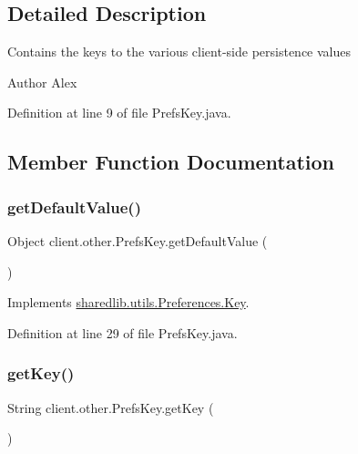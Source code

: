 \subsection{Detailed Description}
Contains the keys to the various client-\/side persistence values \begin{DoxyAuthor}{Author}
Alex 
\end{DoxyAuthor}


Definition at line 9 of file Prefs\+Key.\+java.



\subsection{Member Function Documentation}
\hypertarget{enumclient_1_1other_1_1_prefs_key_a7d50bec7ffef68ca2b9657cc4a8b271f}{}\label{enumclient_1_1other_1_1_prefs_key_a7d50bec7ffef68ca2b9657cc4a8b271f} 
\subsubsection{\texorpdfstring{get\+Default\+Value()}{getDefaultValue()}}
{\footnotesize\ttfamily Object client.\+other.\+Prefs\+Key.\+get\+Default\+Value (\begin{DoxyParamCaption}{ }\end{DoxyParamCaption})}



Implements \hyperlink{interfacesharedlib_1_1utils_1_1_preferences_1_1_key_ab68710164c21a369f40429b1d41eb59e}{sharedlib.\+utils.\+Preferences.\+Key}.



Definition at line 29 of file Prefs\+Key.\+java.

\hypertarget{enumclient_1_1other_1_1_prefs_key_a204beaf7ef2607c5ee052bf712d5fc66}{}\label{enumclient_1_1other_1_1_prefs_key_a204beaf7ef2607c5ee052bf712d5fc66} 
\subsubsection{\texorpdfstring{get\+Key()}{getKey()}}
{\footnotesize\ttfamily String client.\+other.\+Prefs\+Key.\+get\+Key (\begin{DoxyParamCaption}{ }\end{DoxyParamCaption})}




